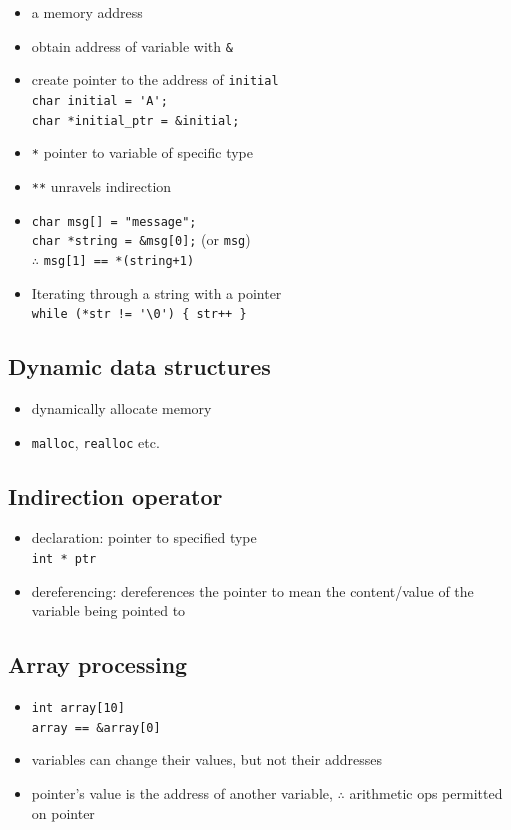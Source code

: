 \documentclass[10pt, multicolumn, a4paper]{article}
\begin{document}
\begin{multicols}{2}
	\begin{itemize}
	\item a memory address
	\item obtain address of variable with \verb|&|
	\item create pointer to the address of \verb|initial| \\
		\verb|char initial = 'A';| \\ \verb|char *initial_ptr = &initial;|
	\item \verb|*| pointer to variable of specific type
	\item \verb|**| unravels indirection
	\item \verb|char msg[] = "message";| \\ \verb|char *string = &msg[0];| (or \verb|msg|)
		\\ $\therefore$ \verb|msg[1] == *(string+1)|
	\item Iterating through a string with a pointer
		\\ \verb|while (*str != '\0') { str++ }|
	\end{itemize}
	\subsection*{Dynamic data structures}
	\begin{itemize}
	\item dynamically allocate memory
	\item \verb|malloc|, \verb|realloc| etc.
	\end{itemize}
	\subsection*{Indirection operator}
	\begin{itemize}
	\item declaration: pointer to specified type \\ \verb|int * ptr|
	\item dereferencing: dereferences the pointer to mean the content/value of the variable being pointed to
	\end{itemize}
	\subsection*{Array processing}
	\begin{itemize}
	\item \verb|int array[10]| \\ \verb|array == &array[0]|
	\item variables can change their values, but not their addresses
	\item pointer's value is the address of another variable, $\therefore$ arithmetic ops permitted on pointer
	\end{itemize}

\end{multicols}
\end{document}

